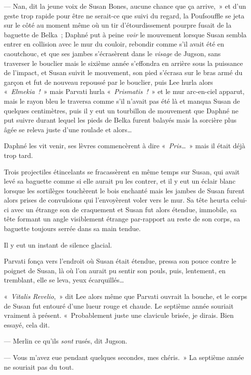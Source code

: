 --- Nan, dit la jeune voix de Susan Bones, aucune chance que ça arrive,~» et d'un geste trop rapide pour être ne serait-ce que suivi du regard, la Poufsouffle se jeta sur le côté au moment même où un tir d'étourdissement pourpre fusait de la baguette de Belka~; Daphné put à peine \emph{voir} le mouvement lorsque Susan sembla entrer en collision avec le mur du couloir, rebondir comme s'il avait été en caoutchouc, et que ses jambes s'écrasèrent dans le \emph{visage} de Jugson, sans traverser le bouclier mais le sixième année s'effondra en arrière sous la puissance de l'impact, et Susan suivit le mouvement, son pied s'écrasa sur le bras armé du garçon et fut de nouveau repoussé par le bouclier, puis Lee hurla alors «~\emph{Elmekia~!}~» mais Parvati hurla «~\emph{Prismatis~!}~» et le mur arc-en-ciel apparut, mais le rayon bleu le traversa comme s'il n'avait pas été là et manqua Susan de quelques centimètres, puis il y eut un tourbillon de mouvement que Daphné ne put suivre durant lequel les pieds de Belka furent balayés mais la sorcière plus âgée se releva juste d'une roulade et alors…

Daphné les vit venir, ses lèvres commencèrent à dire «~\emph{Pris…}~» mais il était déjà trop tard.

Trois projectiles étincelants se fracassèrent en même temps sur Susan, qui avait levé sa baguette comme si elle aurait pu les contrer, et il y eut un éclair blanc lorsque les sortilèges touchèrent le bois enchanté mais les jambes de Susan furent alors prises de convulsions qui l'envoyèrent voler vers le mur. Sa tête heurta celui-ci avec un étrange son de craquement et Susan fut alors étendue, immobile, sa tête formant un angle visiblement étrange par-rapport au reste de son corps, sa baguette toujours serrée dans sa main tendue.

Il y eut un instant de silence glacial.

Parvati fonça vers l'endroit où Susan était étendue, pressa son pouce contre le poignet de Susan, là où l'on aurait pu sentir son pouls, puis, lentement, en tremblant, elle se leva, yeux écarquillés…

«~\emph{Vitalis Revelio},~» dit Lee alors même que Parvati ouvrait la bouche, et le corps de Susan fut entouré d'une lueur rouge et chaude. Le septième année souriait vraiment à présent. «~Probablement juste une clavicule brisée, je dirais. Bien essayé, cela dit.

--- Merlin ce qu'ils \emph{sont} rusés, dit Jugson.

--- Vous m'avez eue pendant quelques secondes, mes chéris.~» La septième année ne souriait pas du tout.

